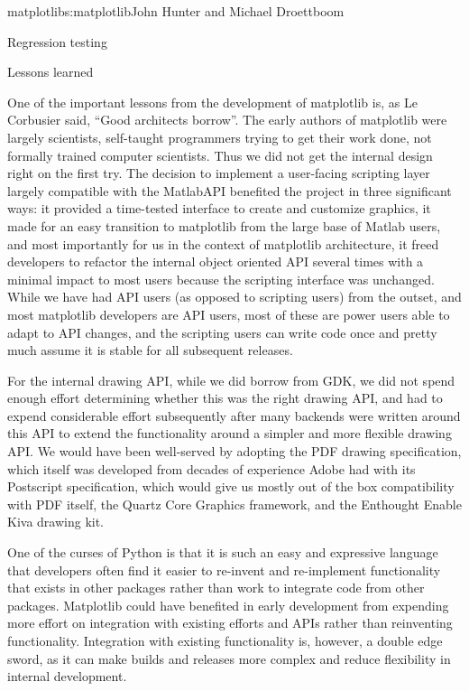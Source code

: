 \begin{aosachapter}{matplotlib}{s:matplotlib}{John Hunter and Michael Droettboom}
\begin{aosasect1}{Regression testing}
\end{aosasect1}

\begin{aosasect1}{Lessons learned}

One of the important lessons from the development of matplotlib is, as
Le Corbusier said, ``Good architects borrow''.  The early authors of
matplotlib were largely scientists, self-taught programmers trying to
get their work done, not formally trained computer scientists.  Thus
we did not get the internal design right on the first try.  The
decision to implement a user-facing scripting layer largely compatible
with the Matlab\texttrademark API benefited the project in three
significant ways: it provided a time-tested interface to create and
customize graphics, it made for an easy transition to matplotlib from
the large base of Matlab users, and most importantly for us in the
context of matplotlib architecture, it freed developers to refactor
the internal object oriented API several times with a minimal impact
to most users because the scripting interface was unchanged.  While we
have had API users (as opposed to scripting users) from the outset,
and most matplotlib developers are API users, most of these are power
users able to adapt to API changes, and the scripting users can write
code once and pretty much assume it is stable for all subsequent
releases.

For the internal drawing API, while we did borrow from GDK, we did not
spend enough effort determining whether this was the right drawing
API, and had to expend considerable effort subsequently after many
backends were written around this API to extend the functionality
around a simpler and more flexible drawing API.  We would have been
well-served by adopting the PDF drawing specification, which itself
was developed from decades of experience Adobe had with its Postscript
specification, which would give us mostly out of the box compatibility
with PDF itself, the Quartz Core Graphics framework, and the Enthought
Enable Kiva drawing kit.

One of the curses of Python is that it is such an easy and expressive
language that developers often find it easier to re-invent and
re-implement functionality that exists in other packages rather than
work to integrate code from other packages.  Matplotlib could have
benefited in early development from expending more effort on
integration with existing efforts and APIs rather than reinventing
functionality.  Integration with existing functionality is, however, a
double edge sword, as it can make builds and releases more complex and
reduce flexibility in internal development.


\end{aosasect1}
\end{aosachapter}
